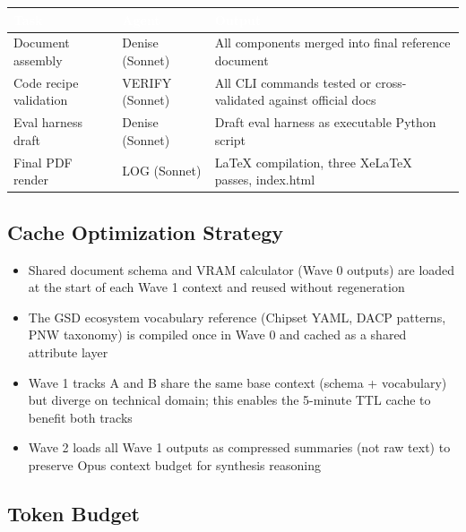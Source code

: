 \documentclass[11pt,letterpaper]{article}
\newcommand{\tableheader}[1]{\textbf{\sffamily\textcolor{white}{#1}}}
\begin{document}
\begin{center}
\begin{tabularx}{\textwidth}{L{3.5cm}L{2cm}X}
\toprule
{}
\tableheader{Task} & \tableheader{Agent} & \tableheader{Output} \\
\midrule
Document assembly & Denise (Sonnet) & All components merged into final reference document \\
Code recipe validation & VERIFY (Sonnet) & All CLI commands tested or cross-validated against official docs \\
Eval harness draft & Denise (Sonnet) & Draft eval harness as executable Python script \\
Final PDF render & LOG (Sonnet) & LaTeX compilation, three XeLaTeX passes, index.html \\
\bottomrule
\end{tabularx}
\end{center}

\subsection{Cache Optimization Strategy}

\begin{itemize}[leftmargin=*]
  \item Shared document schema and VRAM calculator (Wave 0 outputs) are loaded at the start of each Wave 1 context and reused without regeneration
  \item The GSD ecosystem vocabulary reference (Chipset YAML, DACP patterns, PNW taxonomy) is compiled once in Wave 0 and cached as a shared attribute layer
  \item Wave 1 tracks A and B share the same base context (schema + vocabulary) but diverge on technical domain; this enables the 5-minute TTL cache to benefit both tracks
  \item Wave 2 loads all Wave 1 outputs as compressed summaries (not raw text) to preserve Opus context budget for synthesis reasoning
\end{itemize}

\subsection{Token Budget}
\end{document}
